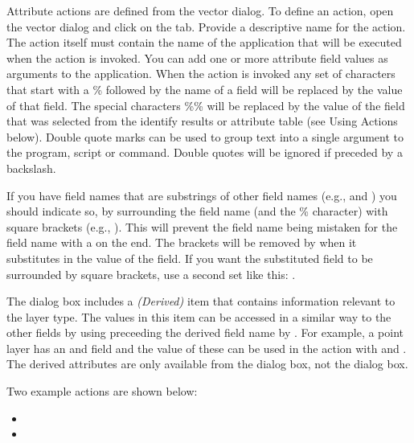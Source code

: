 Attribute actions are defined from the vector  dialog. To
define an action, open the vector  dialog and click on the
 tab. Provide a descriptive name for the action. The action
itself must contain the name of the application that will be executed when the
action is invoked. You can add one or more attribute field values as arguments
to the application. When the action is invoked any set of characters that
start with a \% followed by the name of a field will be replaced by the value of
that field. The special characters \%\% \index{\%\%}will be replaced by the value
of the field that was selected from the identify results or attribute table (see
Using Actions below).  Double quote marks can be used to group text into a
single argument to the program, script or command. Double quotes will be
ignored if preceded by a backslash.

If you have field names that are substrings of other field names (e.g., 
and ) you should
indicate so, by surrounding the field name (and the \% character) with square
brackets (e.g., \usertext{[\%col10]}). This will prevent the  field
name being mistaken for the  field name with a 
on the end. The brackets will be removed by \qg when it substitutes in the
value of the field. If you want the substituted field to be surrounded by square
brackets, use a second set like this: \usertext{[[\%col10]]}.

The  dialog box includes a {\em (Derived)} item that
contains information relevant to the layer type. The
values in this item can be accessed in a similar way to the other fields
by using preceeding the derived field name by . For
example, a point layer has an  and  field and the
value of these can be used in the action with  and
. The derived attributes are only available from the
 dialog box, not the  dialog box.

Two example actions are shown below:

\begin{itemize}[label=--]
  \item {}
  \item {}
\end{itemize}

